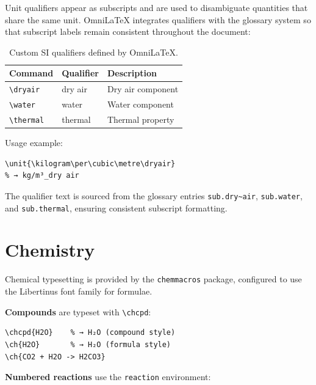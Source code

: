 Unit qualifiers appear as subscripts and are used to disambiguate
quantities that share the same unit.  OmniLaTeX integrates qualifiers
with the glossary system so that subscript labels remain consistent
throughout the document:

\begin{table}[htbp]
  \centering
  \caption{Custom SI qualifiers defined by OmniLaTeX.}
  \label{tab:si-qualifiers}
  \begin{tabular}{@{}llp{}@{}}
    \toprule
    Command & Qualifier & Description \\
    \midrule
    \texttt{\textbackslash dryair}  & dry air  & Dry air component \\
    \texttt{\textbackslash water}   & water    & Water component \\
    \texttt{\textbackslash thermal} & thermal  & Thermal property \\
    \bottomrule
  \end{tabular}
\end{table}

Usage example:

\begin{verbatim}
\unit{\kilogram\per\cubic\metre\dryair}
% → kg/m³_dry air
\end{verbatim}

The qualifier text is sourced from the glossary entries
\texttt{sub.dry\textasciitilde air}, \texttt{sub.water}, and
\texttt{sub.thermal}, ensuring consistent subscript formatting.

\section{Chemistry}

Chemical typesetting is provided by the \texttt{chemmacros} package,
configured to use the Libertinus font family for formulae.

\textbf{Compounds} are typeset with \texttt{\textbackslash chcpd}:

\begin{verbatim}
\chcpd{H2O}    % → H₂O (compound style)
\ch{H2O}       % → H₂O (formula style)
\ch{CO2 + H2O -> H2CO3}
\end{verbatim}

\textbf{Numbered reactions} use the \texttt{reaction} environment:

